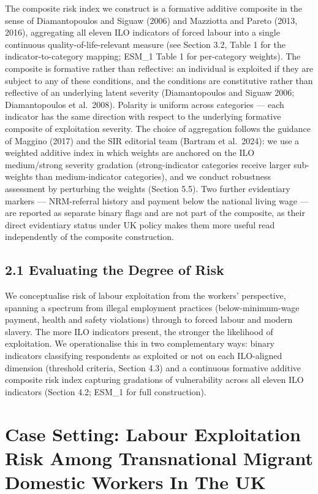 \documentclass[
  12pt,
  letterpaper,
  DIV=11,
  numbers=noendperiod]{scrartcl}
\begin{document}
The composite risk index we construct is a formative additive composite
in the sense of Diamantopoulos and Siguaw (2006) and Mazziotta and
Pareto (2013, 2016), aggregating all eleven ILO indicators of forced
labour into a single continuous quality-of-life-relevant measure (see
Section 3.2, Table 1 for the indicator-to-category mapping; ESM\_1 Table
1 for per-category weights). The composite is formative rather than
reflective: an individual is exploited if they are subject to any of
these conditions, and the conditions are constitutive rather than
reflective of an underlying latent severity (Diamantopoulos and Siguaw
2006; Diamantopoulos et al.~2008). Polarity is uniform across categories
--- each indicator has the same direction with respect to the underlying
formative composite of exploitation severity. The choice of aggregation
follows the guidance of Maggino (2017) and the SIR editorial team
(Bartram et al.~2024): we use a weighted additive index in which weights
are anchored on the ILO medium/strong severity gradation
(strong-indicator categories receive larger sub-weights than
medium-indicator categories), and we conduct robustness assessment by
perturbing the weights (Section 5.5). Two further evidentiary markers
--- NRM-referral history and payment below the national living wage ---
are reported as separate binary flags and are not part of the composite,
as their direct evidentiary status under UK policy makes them more
useful read independently of the composite construction.

\subsection{2.1 Evaluating the Degree of
Risk}\label{evaluating-the-degree-of-risk}

We conceptualise risk of labour exploitation from the workers'
perspective, spanning a spectrum from illegal employment practices
(below-minimum-wage payment, health and safety violations) through to
forced labour and modern slavery. The more ILO indicators present, the
stronger the likelihood of exploitation. We operationalise this in two
complementary ways: binary indicators classifying respondents as
exploited or not on each ILO-aligned dimension (threshold criteria,
Section 4.3) and a continuous formative additive composite risk index
capturing gradations of vulnerability across all eleven ILO indicators
(Section 4.2; ESM\_1 for full construction).

\section{Case Setting: Labour Exploitation Risk Among Transnational
Migrant Domestic Workers In The
UK}\label{case-setting-labour-exploitation-risk-among-transnational-migrant-domestic-workers-in-the-uk}
\end{document}
